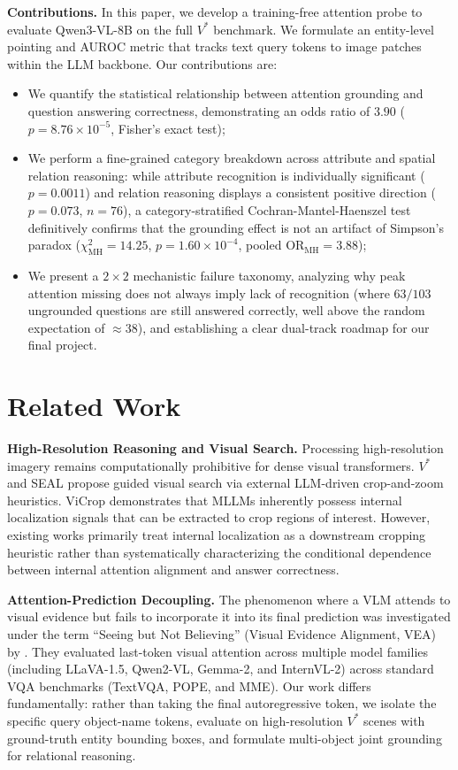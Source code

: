 \documentclass{article}
\begin{document}
\textbf{Contributions.} In this paper, we develop a training-free attention probe to evaluate Qwen3-VL-8B \citep{qwen2025qwen3vl} on the full $V^*$ benchmark. We formulate an entity-level pointing and AUROC metric that tracks text query tokens to image patches within the LLM backbone. Our contributions are:
\begin{itemize}
    \item We quantify the statistical relationship between attention grounding and question answering correctness, demonstrating an odds ratio of $3.90$ ($p = 8.76 \times 10^{-5}$, Fisher's exact test);
    \item We perform a fine-grained category breakdown across attribute and spatial relation reasoning: while attribute recognition is individually significant ($p=0.0011$) and relation reasoning displays a consistent positive direction ($p=0.073$, $n=76$), a category-stratified Cochran-Mantel-Haenszel test definitively confirms that the grounding effect is not an artifact of Simpson's paradox ($\chi^2_{\text{MH}} = 14.25$, $p = 1.60 \times 10^{-4}$, pooled $\text{OR}_{\text{MH}} = 3.88$);
    \item We present a $2 \times 2$ mechanistic failure taxonomy, analyzing why peak attention missing does not always imply lack of recognition (where $63/103$ ungrounded questions are still answered correctly, well above the random expectation of $\approx 38$), and establishing a clear dual-track roadmap for our final project.
\end{itemize}

\section{Related Work}

\textbf{High-Resolution Reasoning and Visual Search.}
Processing high-resolution imagery remains computationally prohibitive for dense visual transformers. $V^*$ and SEAL \citep{wu2024vstar} propose guided visual search via external LLM-driven crop-and-zoom heuristics. ViCrop \citep{zhang2025vicrop} demonstrates that MLLMs inherently possess internal localization signals that can be extracted to crop regions of interest. However, existing works primarily treat internal localization as a downstream cropping heuristic rather than systematically characterizing the conditional dependence between internal attention alignment and answer correctness.

\textbf{Attention-Prediction Decoupling.}
The phenomenon where a VLM attends to visual evidence but fails to incorporate it into its final prediction was investigated under the term ``Seeing but Not Believing'' (Visual Evidence Alignment, VEA) by \citet{liu2026seeing}. They evaluated last-token visual attention across multiple model families (including LLaVA-1.5, Qwen2-VL, Gemma-2, and InternVL-2) across standard VQA benchmarks (TextVQA, POPE, and MME). Our work differs fundamentally: rather than taking the final autoregressive token, we isolate the specific query object-name tokens, evaluate on high-resolution $V^*$ scenes with ground-truth entity bounding boxes, and formulate multi-object joint grounding for relational reasoning.
\end{document}
